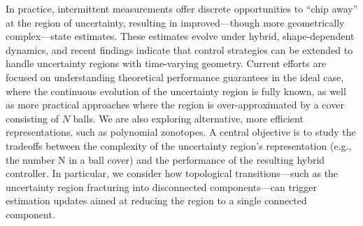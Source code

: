 \documentclass[letterpaper,11pt]{article}
\newcommand{\dg}[1]{{\textcolor{blue}{#1}}}
\begin{document}
In practice, intermittent measurements offer discrete opportunities to “chip away” at the region of uncertainty, resulting in improved—though more geometrically complex—state estimates.
These estimates evolve under hybrid, shape-dependent dynamics, and recent findings indicate that control strategies can be extended to handle uncertainty regions with time-varying geometry.
Current efforts are focused on understanding theoretical performance guarantees in the ideal case, where the continuous evolution of the uncertainty region is fully known, as well as more practical approaches where the region is over-approximated by a cover consisting of $N$ balls.
We are also exploring alternative, more efficient representations, such as polynomial zonotopes.
A central objective is to study the tradeoffs between the complexity of the uncertainty region’s representation (e.g., the number N in a ball cover) and the performance of the resulting hybrid controller.
In particular, we consider how topological transitions—such as the uncertainty region fracturing into disconnected components—can trigger estimation updates aimed at reducing the region to a single connected component.

\end{document}
